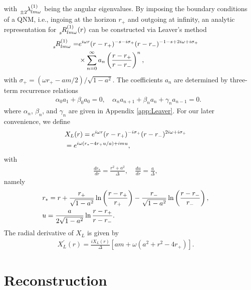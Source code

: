 \documentclass[aps,prd,amsmath,floats,floatfix, twocolumn,
superscriptaddress,nofootinbib,showpacs]{revtex4-1}
\begin{document}
with $\tensor[_{\pm 2}]{{\lambda_{lm\omega}^{(1)}}}{}$ being the angular eigenvalues. By imposing the boundary conditions of a QNM, i.e., ingoing at the horizon $r_+$ and outgoing at infinity, an analytic representation for $\tensor[_{s}]{{R_{lm\omega}^{(1)}}}{}(r)$ can be constructed via Leaver's method \cite{leaver1985analytic}
\begin{align}
    \tensor[_{s}]{{R_{lm\omega}^{(1)}}}{} =& e^{i \omega r} (r-r_+)^{-s-i\sigma_+}(r-r_-)^{-1-s+2i \omega +i \sigma_+} \nonumber \\
    &\times \sum^\infty_{n=0} a_n \left( \frac{r-r_+}{r-r_-}\right)^n, \label{eq:leaver_method_s}
\end{align}
with $\sigma_+ =(\omega r_+-a m/2)/\sqrt{1-a^2}$. The coefficients $a_n$ are determined by three-term recurrence relations
\begin{align}
    & \alpha_0 a_1 +\beta_0 a_0 = 0, \quad \alpha_n a_{n+1}+\beta_n a_n+\gamma_n a_{n-1}=0. \label{eq:leaver_method_three_term_recurrence}
\end{align} 
where $\alpha_n$, $\beta_n$, and $\gamma_n$ are given in Appendix \ref{app:Leaver}. For our later convenience, we define 
\begin{align}
    &X_L(r)= e^{i \omega r} (r-r_+)^{-i\sigma_+}(r-r_-)^{2i \omega +i \sigma_+}\notag \\
    &=e^{i\omega \left(r_*-4r_+ u/a\right)+imu},  \label{eq:Leaver_XL}
\end{align}
with
\begin{align}
    \frac{dr_*}{dr}=\frac{r^2+a^2}{\Delta}, \quad \frac{du}{dr}=\frac{a}{\Delta}, \label{eq:def_rstar_u}
\end{align}
namely 
\begin{align}
    &r_*=r+\frac{r_+}{\sqrt{1-a^2}}\ln \left(\frac{r-r_+}{r_+}\right)-\frac{r_-}{\sqrt{1-a^2}}\ln \left(\frac{r-r_-}{r_-}\right), \notag \\
    &u=\frac{a}{2\sqrt{1-a^2}}\ln\frac{r-r_+}{r-r_-}. \notag 
\end{align}
The radial derivative of $X_L$ is given by
\begin{align}
    X_L^\prime (r)=\frac{iX_L(r)}{\Delta}\left[am+\omega (a^2+r^2-4r_+)\right].
\end{align}


\section{Reconstruction}
\label{sec:metric_reconstruction}
\end{document}
